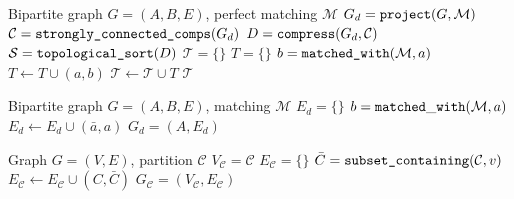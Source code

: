 \documentclass[smallextended]{svjour3}
\begin{document}
\begin{algorithm}
  \caption{: {\tt block\_triangularize}}
  \begin{algorithmic}[1]
     Bipartite graph $G=(A,B,E)$, perfect matching $\mathcal{M}$
    \State $G_d = \text{\tt project}(G, \mathcal{M})$ 
    \State $\mathcal{C} = \text{\tt strongly\_connected\_comps}(G_d)$ 
    \State $D = \text{\tt compress}(G_d, \mathcal{C})$ 
    \State $\mathcal{S} = \text{\tt topological\_sort}(D)$
    \State $\mathcal{T} = \{\}$
     
    \State $T = \{\}$ 
        \State $b=\text{\tt matched\_with}(\mathcal{M}, a)$
        \State $T \gets T \cup (a, b)$
      \EndFor
      \State $\mathcal{T} \gets \mathcal{T} \cup T$
    \EndFor
     $\mathcal{T}$
  \end{algorithmic}
  \label{alg:block-triangularize}
\end{algorithm}

\begin{algorithm}
  \caption{: {\tt project}}
  \begin{algorithmic}[1]
     Bipartite graph $G=(A,B,E)$, matching $\mathcal{M}$
    \State $E_d=\{\}$
      \State $b={\tt matched\_with}(\mathcal{M}, a)$
        \State $E_d \gets E_d \cup (\bar a, a)$
      \EndFor
    \EndFor
     $G_d=(A,E_d)$
  \end{algorithmic}
  \label{alg:project}
\end{algorithm}

\begin{algorithm}
  \caption{: {\tt compress}}
  \begin{algorithmic}[1]
     Graph $G=(V,E)$, partition $\mathcal{C}$
    \State $V_\mathcal{C} =\mathcal{C}$
    \State $E_\mathcal{C} = \{\}$
          \State $\bar C = \text{\tt subset\_containing}(\mathcal{C}, v)$
            \State $E_\mathcal{C}\gets E_\mathcal{C} \cup (C, \bar C)$
          \EndIf
        \EndFor
      \EndFor
    \EndFor
     $G_\mathcal{C}=(V_\mathcal{C},E_\mathcal{C})$
  \end{algorithmic}
  \label{alg:compress}
\end{algorithm}
\end{document}

